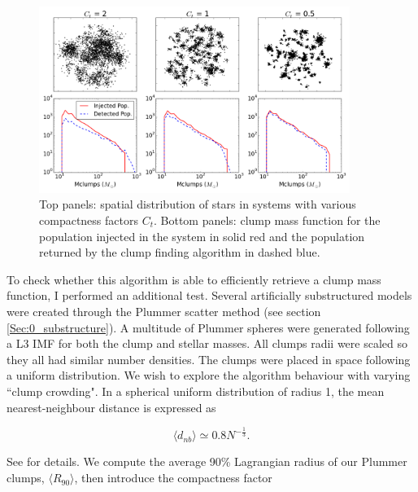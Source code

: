   
   
\begin{figure}
\begin{center}
\includegraphics[width=0.9\textwidth]{Figures/2_clumpcheck.png}
\caption[Retrieval of a known clump mass function to test the algorithm]{Top panels: spatial distribution of stars in systems with various compactness factors $C_t$. Bottom panels: clump mass function for the population injected in the system in solid red and the population returned by the clump finding algorithm in dashed blue.}
\label{Fig:2_clumpcheck}
\end{center}
\end{figure} 



   
   To check whether this algorithm is able to efficiently retrieve a clump mass function, I performed an additional test. Several artificially substructured models were created through the Plummer scatter method (see section \ref{Sec:0_substructure}). A multitude of Plummer spheres were generated following a L3 IMF for both the clump  and stellar masses. All clumps radii were scaled so they all had similar number densities. The clumps were placed in space following a uniform distribution. We wish to explore the algorithm behaviour with varying ``clump crowding". In a spherical uniform distribution of radius 1, the mean nearest-neighbour distance is expressed as
 
\begin{equation}
\langle d_{nb}\rangle \simeq 0.8 N^{-\frac{1}{3}} .
\end{equation}
   
See \cite{Chandrasekhar1943} for details. We compute the average 90\% Lagrangian radius of our Plummer clumps, $\langle R_{90}\rangle$, then introduce the compactness factor

